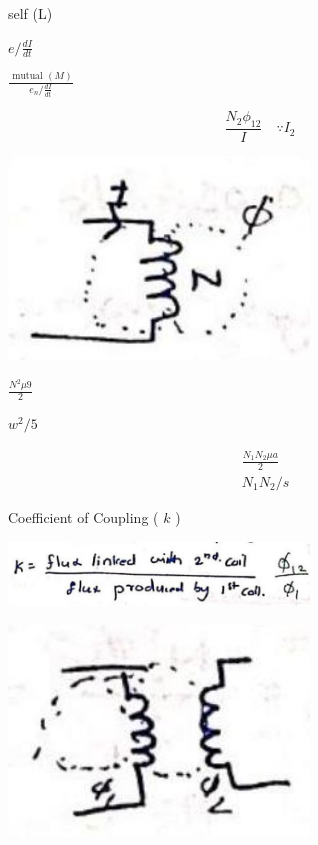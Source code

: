 \documentclass[12pt, a4paper]{article}
\newcommand{\figwidth}{8cm}
\begin{document}
self (L)

$e / \frac{d I}{d t}$

$\frac{\text { mutual }(M)}{e_{n} / \frac{d I}{d t}}$

$$
	\frac{N_{2} \phi_{12}}{I} \quad \because I_{2}
$$

\begin{center}
	\includegraphics[max width=\figwidth]{2024_06_15_ae1c13e212c06c234cc4g-09(2)}
\end{center}

$\frac{N^{2} \mu 9}{2}$

$w^{2} / 5$

$$
	\begin{aligned}
		 & \frac{N_{1} N_{2} \mu a}{2} \\
		 & N_{1} N_{2} / s
	\end{aligned}
$$

Coefficient of Coupling ( $k$ )

\begin{center}
	\includegraphics[max width=\figwidth]{2024_06_15_ae1c13e212c06c234cc4g-09(3)}
\end{center}

\begin{center}
	\includegraphics[max width=\figwidth]{2024_06_15_ae1c13e212c06c234cc4g-09}
\end{center}
\end{document}
